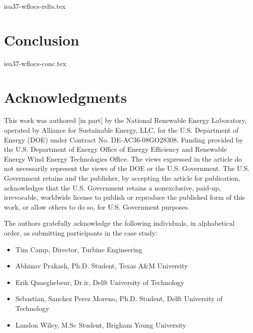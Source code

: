 \documentclass[conf,hidelinks]{new-aiaa} %
\begin{document}
	{iea37-wflocs-rslts.tex}

\section{Conclusion} \label{sec:conc}

	{iea37-wflocs-conc.tex}

\pagebreak
\appendix

\section*{Acknowledgments}
This work was authored [in part] by the National Renewable Energy Laboratory, operated by Alliance for Sustainable Energy, LLC, for the U.S. Department of Energy (DOE) under Contract No. DE-AC36-08GO28308.
Funding provided by the U.S. Department of Energy Office of Energy Efficiency and Renewable Energy Wind Energy Technologies Office.
The views expressed in the article do not necessarily represent the views of the DOE or the U.S. Government.
The U.S. Government retains and the publisher, by accepting the article for publication, acknowledges that the U.S. Government retains a nonexclusive, paid-up, irrevocable, worldwide license to publish or reproduce the published form of this work, or allow others to do so, for U.S. Government purposes.

The authors gratefully acknowledge the following individuals, in alphabetical order, as submitting participants in the case study:
\begin{itemize}
	\item Tim Camp, Director, Turbine Engineering
	\item Abhinav Prakash, Ph.D. Student, Texas A\&M University
	\item Erik Quaeghebeur, Dr.ir, Delft University of Technology
	\item Sebastian, Sanchez Perez Moreno, Ph.D. Student, Delft University of Technology
	\item Landon Wiley, M.Sc Student, Brigham Young University
\end{itemize}
\end{document}
